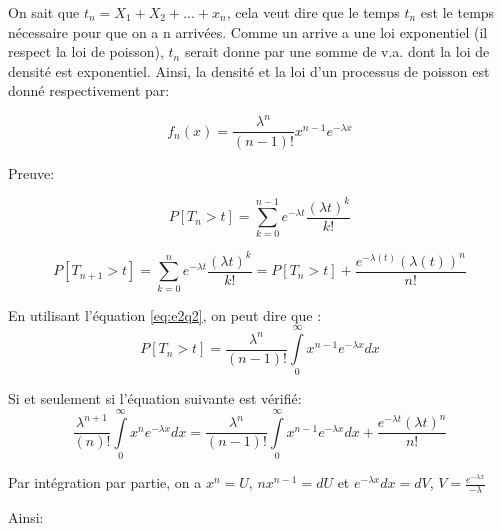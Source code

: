 \documentclass[a4paper]{article}
\begin{document}
On sait que $t_n= X_1 + X_2+ ...+ x_n$, cela veut dire que le temps $t_n$ est le
temps nécessaire pour que on a n arrivées. Comme un arrive a une loi exponentiel
(il respect la loi de poisson), $t_n$ serait donne par une somme de v.a. dont la
loi de  densité est exponentiel. Ainsi, la  densité et la loi  d'un processus de
poisson est donné respectivement par:

\begin{equation}
f_n(x)=\frac{\lambda^{n}}{(n-1)!}x^{n-1}e^{-\lambda x}
\end{equation}

Preuve:


\begin{equation} 
P[T_n > t] = \sum_{k=0}^{n-1}e^{-\lambda t}\frac{(\lambda t)^k}{k!}
\end{equation}

\begin{equation}\label{eq:e2q2}
P[T_{n+1} >  t] = \sum_{k=0}^{n}e^{-\lambda t}\frac{(\lambda  t)^k}{k!}= P[T_n >
t]+ \frac{e^{-\lambda (t)}(\lambda (t))^n}{n!}
\end{equation}

En utilisant l'équation \ref{eq:e2q2}, on peut dire que :
\begin{equation} 
P[T_n  > t] =  \frac{\lambda^{n}}{(n-1)!}\int\limits_0^\infty x^{n-1}e^{-\lambda
  x}dx
\end{equation}

Si et seulement si l'équation suivante est vérifié:
\begin{equation} 
\frac{\lambda^{n+1}}{(n)!}\int\limits_0^\infty x^{n}e^{-\lambda
  x}dx = \frac{\lambda^{n}}{(n-1)!}\int\limits_0^\infty x^{n-1}e^{-\lambda
  x}dx +  \frac{e^{-\lambda t}(\lambda t)^n}{n!}
\end{equation}

Par intégration  par partie,  on a $  x^n =  U$, $nx^{n-1}=dU$ et  $ e^{-\lambda
  x}dx=dV$, $V=\frac{e^{-\lambda x}}{-\lambda}$

Ainsi:

\end{document}
